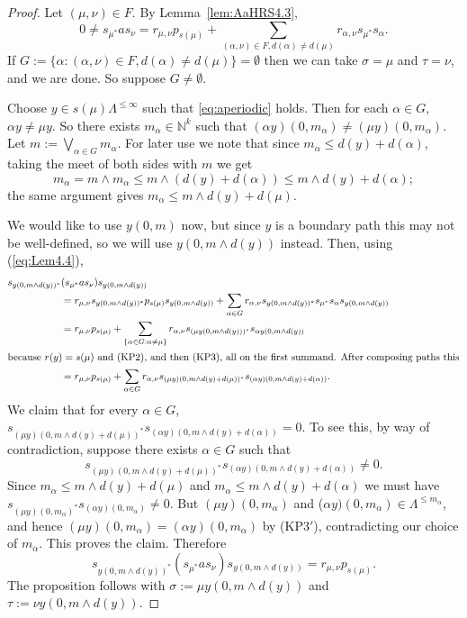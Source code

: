 \documentclass[a4paper,12pt]{amsart}
\numberwithin{equation}{section}
\theoremstyle{definition}
\theoremstyle{remark}
\begin{document}
\begin{proof}  Let $(\mu,\nu)\in F$. By Lemma~\ref{lem:AaHRS4.3}, 
\begin{equation}
\label{eq:Lem4.4}
0 \neq s_{\mu^*}as_\nu = r_{\mu,\nu}p_{s(\mu)}+\sum_{(\alpha,\nu)\in F, d(\alpha)\neq d(\mu)} 
r_{\alpha,\nu}s_{\mu^*}s_\alpha.
\end{equation}
If $G:=\{\alpha: (\alpha,\nu)\in F, d(\alpha)\neq d(\mu)\}=\emptyset$ then we can take $\sigma=\mu$ and $\tau=\nu$, and we are done. So suppose $G\neq \emptyset$.

Choose $y \in s(\mu)\Lambda^{\leq \infty}$ such that \eqref{eq:aperiodic} holds. Then for each
$\alpha \in G$, $\alpha y \neq \mu y$. 
So there exists $m_{\alpha}\in{\mathbb{N}}^k$ such that
$(\alpha y)(0,m_{\alpha}) \neq (\mu y)(0,m_{\alpha})$.  Let 
$m:=  \bigvee_{\alpha \in G} m_\alpha$.    For later use we note that since $m_\alpha \leq d(y) + d(\alpha)$, taking the meet of both sides with $m$ we get
\[m_\alpha=m \wedge m_{\alpha} \leq m \wedge (d(y) + d(\alpha)) \leq m \wedge d(y) + d(\alpha);
\]
the same argument gives $m_{\alpha} \leq m \wedge d(y) + d(\mu)$.

We would like to use $y(0, m)$ now, but since $y$ is a boundary path this may not be well-defined, so we will use $y(0, m\wedge d(y))$ instead.
Then, using (\ref{eq:Lem4.4}), 
\begin{align*}
s_{y(0,m\wedge d(y))^*}&(s_{\mu^*}as_\nu)s_{y(0,m\wedge d(y))}\\
&=r_{\mu,\nu}s_{y(0,m\wedge d(y))^*}p_{s(\mu)}s_{y(0,m\wedge d(y))} + 
\sum_{\alpha \in G}r_{\alpha,\nu}s_{y(0,m\wedge d(y))^*}s_{\mu^*}s_\alpha s_{y(0,m\wedge d(y))}\\
&=r_{\mu,\nu}p_{s(\mu)}+ \sum_{\{\alpha \in G: \alpha \neq \mu\}} 
r_{\alpha,\nu}s_{(\mu y(0,m\wedge d(y)))^*}s_{\alpha y(0,m\wedge d(y))} \\
\intertext{because $r(y)=s(\mu)$ and (KP2), and then (KP3), all on the first summand. After composing paths this}
&=r_{\mu,\nu}p_{s(\mu)}+ \sum_{\alpha \in G}
 r_{\alpha,\nu}s_{(\mu y)(0,m\wedge d(y)+d(\mu))^*}s_{(\alpha y)(0,m\wedge d(y)+d(\alpha))}.
\end{align*}
We claim that for every $\alpha \in G$, $s_{(\mu y)(0,m\wedge d(y)+d(\mu))^*}s_{(\alpha y)(0,m\wedge d(y)+d(\alpha))}=0$. 
To see this, by way of contradiction, suppose there
exists $\alpha \in G$ such that  
\[s_{(\mu y)(0,m\wedge d(y)+d(\mu))^*}s_{(\alpha y)(0,m\wedge d(y)+d(\alpha))} \neq 0.\] 
Since $m_\alpha\leq m\wedge d(y)+d(\mu)$ and $m_\alpha\leq m\wedge d(y)+d(\alpha)$  we must have  $s_{(\mu y)(0,m_\alpha)^*}s_{(\alpha y)(0,m_\alpha)} \neq 0$. But $(\mu y)(0,m_\alpha)$ and ($\alpha y)(0,m_\alpha)\in\Lambda^{\leq m_\alpha}$, and hence $(\mu y)(0,m_\alpha)=(\alpha y)(0, m_\alpha)$ by (KP3$'$), 
contradicting our choice of $m_{\alpha}$.  This proves the claim. 
Therefore
\[s_{y(0,m\wedge d(y))^*}(s_{\mu^*}as_\nu)s_{y(0,m\wedge d(y))}=r_{\mu,\nu}p_{s(\mu)}.\]
The proposition follows with $\sigma:=\mu y(0,m\wedge d(y))$ and  
$\tau:=\nu y(0,m\wedge d(y))$.
\end{proof}
\end{document}

